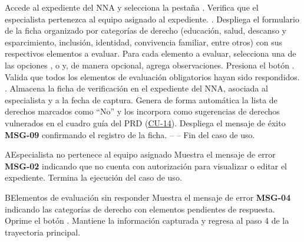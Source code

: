\begin{UCtrayectoria}
	\UCpaso[\UCactor] Accede al expediente del NNA y selecciona la pestaña .
	\UCpaso Verifica que el especialista pertenezca al equipo asignado al expediente. .
	\UCpaso Despliega el formulario de la ficha organizado por categorías de derecho (educación, salud, descanso y esparcimiento, inclusión, identidad, convivencia familiar, entre otros) con sus respectivos elementos a evaluar.
	\UCpaso[\UCactor] Para cada elemento a evaluar, selecciona una de las opciones ,  o  y, de manera opcional, agrega observaciones.
	\UCpaso[\UCactor] Presiona el botón .
	\UCpaso Valida que todos los elementos de evaluación obligatorios hayan sido respondidos. .
	\UCpaso Almacena la ficha de verificación en el expediente del NNA, asociada al especialista y a la fecha de captura.
	\UCpaso Genera de forma automática la lista de derechos marcados como ``No'' y los incorpora como sugerencias de derechos vulnerados en el cuadro guía del PRD (\hyperlink{CU-14}{CU-14}).
	\UCpaso Despliega el mensaje de éxito {\bf MSG-09} confirmando el registro de la ficha.
	\UCpaso[] -- -- Fin del caso de uso.
\end{UCtrayectoria}

\begin{UCtrayectoriaA}{A}{Especialista no pertenece al equipo asignado}
	\UCpaso Muestra el mensaje de error {\bf MSG-02} indicando que no cuenta con autorización para visualizar o editar el expediente.
	\UCpaso Termina la ejecución del caso de uso.
\end{UCtrayectoriaA}

\begin{UCtrayectoriaA}{B}{Elementos de evaluación sin responder}
	\UCpaso Muestra el mensaje de error {\bf MSG-04} indicando las categorías de derecho con elementos pendientes de respuesta.
	\UCpaso[\UCactor] Oprime el botón .
	\UCpaso Mantiene la información capturada y regresa al paso 4 de la trayectoria principal.
\end{UCtrayectoriaA}
